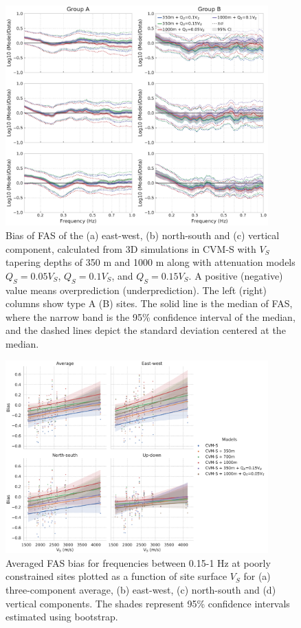 \begin{figure}[!ht]
  \centering
  \includegraphics[width=0.9\textwidth]{figures/figure_vs30_S2.pdf}
  \caption{Bias of FAS of the (a) east-west, (b) north-south and (c) vertical component, calculated from 3D simulations in CVM-S with $V_S$ tapering depths of 350 m and 1000 m along with attenuation models $Q_S=0.05V_S$, $Q_S=0.1V_S$, and $Q_S=0.15V_S$. A positive (negative) value means overprediction (underprediction). The left (right) columns show type A (B) sites. The solid line is the median of FAS, where the narrow band is the 95\% confidence interval of the median, and the dashed lines depict the standard deviation centered at the median.}
  \label{fig:vs30-A2}
\end{figure}
\clearpage

\begin{figure}[!ht]
  \centering
  \includegraphics[width=0.9\textwidth]{figures/figure_vs30_S3.pdf}
  \caption{Averaged FAS bias for frequencies between 0.15-1 Hz at poorly constrained sites plotted as a function of site surface $V_S$ for (a) three-component average, (b) east-west, (c) north-south and (d) vertical components. The shades represent 95\% confidence intervals estimated using bootstrap.}
  \label{fig:vs30-A3}
\end{figure}


\renewcommand{\thetable}{\arabic{table}}
\renewcommand{\thefigure}{\arabic{figure}}



